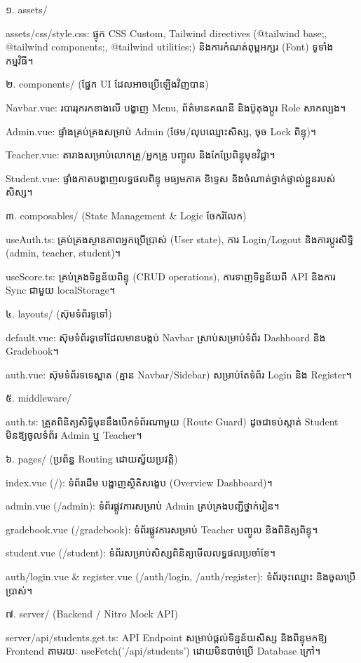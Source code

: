 ១. assets/

assets/css/style.css: ផ្ទុក CSS Custom, Tailwind directives (@tailwind base;, @tailwind components;, @tailwind utilities;) និងការកំណត់ពុម្ពអក្សរ (Font) ទូទាំងកម្មវិធី។

២. components/ (ផ្នែក UI ដែលអាចប្រើឡើងវិញបាន)

Navbar.vue: របាររុករកខាងលើ បង្ហាញ Menu, ព័ត៌មានគណនី និងប៊ូតុងប្តូរ Role សាកល្បង។

Admin.vue: ផ្ទាំងគ្រប់គ្រងសម្រាប់ Admin (ថែម/លុបឈ្មោះសិស្ស, ចុច Lock ពិន្ទុ)។

Teacher.vue: តារាងសម្រាប់លោកគ្រូ/អ្នកគ្រូ បញ្ចូល និងកែប្រែពិន្ទុមុខវិជ្ជា។

Student.vue: ផ្ទាំងកាតបង្ហាញលទ្ធផលពិន្ទុ មធ្យមភាគ និទ្ទេស និងចំណាត់ថ្នាក់ផ្ទាល់ខ្លួនរបស់សិស្ស។

៣. composables/ (State Management & Logic ចែករំលែក)

useAuth.ts: គ្រប់គ្រងស្ថានភាពអ្នកប្រើប្រាស់ (User state), ការ Login/Logout និងការប្តូរសិទ្ធិ (admin, teacher, student)។

useScore.ts: គ្រប់គ្រងទិន្នន័យពិន្ទុ (CRUD operations), ការទាញទិន្នន័យពី API និងការ Sync ជាមួយ localStorage។

៤. layouts/ (ស៊ុមទំព័រទូទៅ)

default.vue: ស៊ុមទំព័រទូទៅដែលមានបង្កប់ Navbar ស្រាប់សម្រាប់ទំព័រ Dashboard និង Gradebook។

auth.vue: ស៊ុមទំព័រទទេស្អាត (គ្មាន Navbar/Sidebar) សម្រាប់តែទំព័រ Login និង Register។

៥. middleware/

auth.ts: ត្រួតពិនិត្យសិទ្ធិមុននឹងបើកទំព័រណាមួយ (Route Guard) ដូចជាទប់ស្កាត់ Student មិនឱ្យចូលទំព័រ Admin ឬ Teacher។

៦. pages/ (ប្រព័ន្ធ Routing ដោយស្វ័យប្រវត្តិ)

index.vue (/): ទំព័រដើម បង្ហាញស្ថិតិសង្ខេប (Overview Dashboard)។

admin.vue (/admin): ទំព័រផ្លូវការសម្រាប់ Admin គ្រប់គ្រងបញ្ជីថ្នាក់រៀន។

gradebook.vue (/gradebook): ទំព័រផ្លូវការសម្រាប់ Teacher បញ្ចូល និងពិនិត្យពិន្ទុ។

student.vue (/student): ទំព័រសម្រាប់សិស្សពិនិត្យមើលលទ្ធផលប្រចាំខែ។

auth/login.vue & register.vue (/auth/login, /auth/register): ទំព័រចុះឈ្មោះ និងចូលប្រើប្រាស់។

៧. server/ (Backend / Nitro Mock API)

server/api/students.get.ts: API Endpoint សម្រាប់ផ្ដល់ទិន្នន័យសិស្ស និងពិន្ទុមកឱ្យ Frontend តាមរយៈ useFetch('/api/students') ដោយមិនបាច់ប្រើ Database ក្រៅ។

